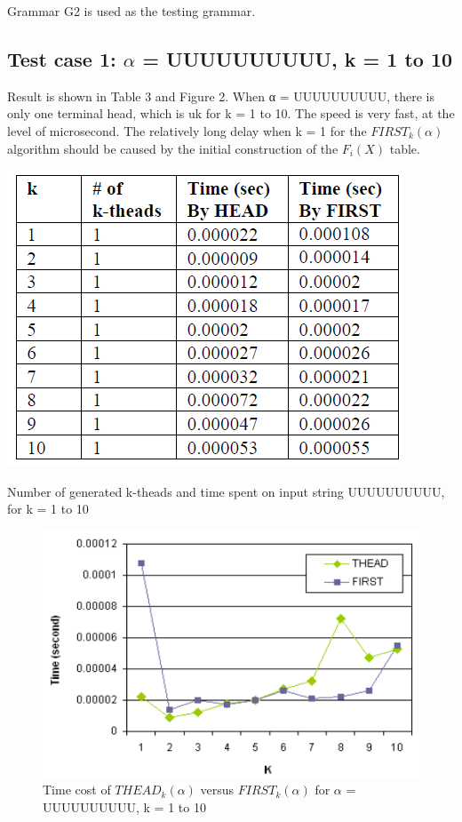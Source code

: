 \documentclass{sig-alternate-05-2015}
\begin{document}
Grammar G2 is used as the testing grammar.

\subsection{Test case 1: $\alpha$ = UUUUUUUUUU, k = 1 to 10}
Result is shown in Table 3 and Figure 2. When α =
UUUUUUUUUU, there is only one terminal head, which is
uk for k = 1 to 10. The speed is very fast, at the level of
microsecond. The relatively long delay when k = 1 for the
$FIRST_k(\alpha)$ algorithm should be caused by the initial construction
of the $F_i(X)$ table.


\begin{table}
\centering
\includegraphics[scale=0.5]{table3.PNG}
\caption{Number of generated k-theads and time spent on
input string UUUUUUUUUU, for k = 1 to 10}
\label{table:3}
\end{table}

\begin{figure}
\centering
\includegraphics[scale=0.5]{figure2.PNG}
\caption{Time cost of $THEAD_k(\alpha)$ versus $FIRST_k(\alpha)$
for $\alpha$ = UUUUUUUUUU, k = 1 to 10}
\label{fig:2}
\end{figure}
\end{document}
